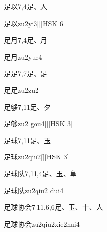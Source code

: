 \begin{Entry}{足以}{7,4}{⾜、⼈}
  \begin{Phonetics}{足以}{zu2yi3}[][HSK 6]
  \end{Phonetics}
\end{Entry}

\begin{Entry}{足月}{7,4}{⾜、⽉}
  \begin{Phonetics}{足月}{zu2yue4}
  \end{Phonetics}
\end{Entry}

\begin{Entry}{足足}{7,7}{⾜、⾜}
  \begin{Phonetics}{足足}{zu2zu2}
  \end{Phonetics}
\end{Entry}

\begin{Entry}{足够}{7,11}{⾜、⼣}
  \begin{Phonetics}{足够}{zu2 gou4}[][HSK 3]
  \end{Phonetics}
\end{Entry}

\begin{Entry}{足球}{7,11}{⾜、⽟}
  \begin{Phonetics}{足球}{zu2qiu2}[][HSK 3]
  \end{Phonetics}
\end{Entry}

\begin{Entry}{足球队}{7,11,4}{⾜、⽟、⾩}
  \begin{Phonetics}{足球队}{zu2qiu2 dui4}
  \end{Phonetics}
\end{Entry}

\begin{Entry}{足球协会}{7,11,6,6}{⾜、⽟、⼗、⼈}
  \begin{Phonetics}{足球协会}{zu2qiu2xie2hui4}
  \end{Phonetics}
\end{Entry}

